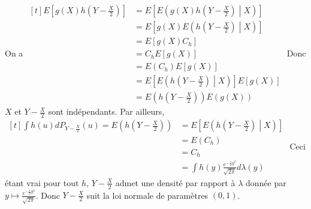 \documentclass{report}
\begin{document}
On a $\begin{aligned}[t]
E\left[g(X)h(Y-\frac{X}{2})\right] &=
E\left[E\left(g(X)h(Y-\frac{X}{2})\middle|X\right)\right] \\
&=E\left[g(X)E\left(h(Y-\frac{X}{2})\middle|X\right)\right] \\
&= E[g(X)C_h] \\
&= C_h E[g(X)] \\
&= E(C_h) E[g(X)] \\
&=E\left[E\left(h(Y-\frac{X}{2})\middle|X\right)\right]E[g(X)] \\
&=E\left( h(Y-\frac{X}{2})\right) E(g(X))
\end{aligned}$\newline
Donc $X$ et $Y-\frac{X}{2}$ sont indépendants.\newline
\newline
Par ailleurs, $\begin{aligned}[t]\int h(u)dP_{Y-\frac{X}{2}}(u) = E(h(Y-\frac{X}{2})) &= E\left[E\left(h(Y-\frac{X}{2})\middle|X\right)\right]\\
&= E(C_h) \\
&= C_h \\
&= \int h(y) \frac{e^{-\frac 12 y^2}}{\sqrt {2\pi}} d\lambda(y) \end{aligned}$
\newline
Ceci étant vrai pour tout $h$, $Y-\frac{X}{2}$ admet une densité par rapport à $\lambda$ donnée par $y\mapsto \frac{e^{-\frac 12 y^2}}{\sqrt {2\pi}}$.\newline
Donc $Y-\frac{X}{2}$ suit la loi normale de paramètres $(0,1)$.
\end{document}
